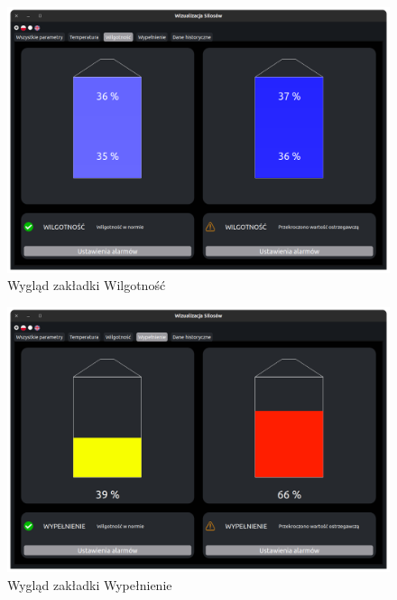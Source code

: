     \begin{figure}[H]
        \centering
        \includegraphics[width = \textwidth]{obrazy/hum_tab.png}
        \caption{Wygląd zakładki Wilgotność}
        \label{fig: hum tab}
    \end{figure}


    \begin{figure}[H]
        \centering
        \includegraphics[width = \textwidth]{obrazy/temp_tab.png}
        \caption{Wygląd zakładki Wypełnienie}
        \label{fig: vol tab}
    \end{figure}


